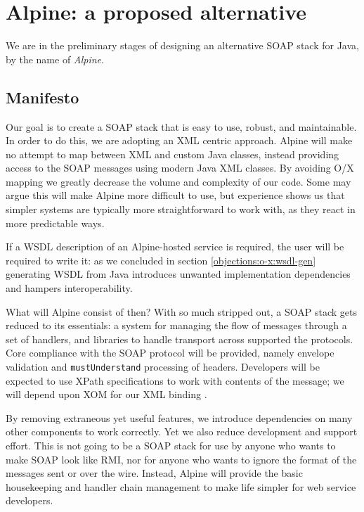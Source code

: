 \section{Alpine: a proposed alternative}
\label{alpine}

We are in the preliminary stages of designing an alternative SOAP
stack for Java, by the name of \emph{Alpine}.

\subsection{Manifesto}
\label{alpine:manifesto}

Our goal is to create a SOAP stack that is easy to use, robust, and
maintainable. In order to do this, we are adopting an XML centric approach.
Alpine will make no attempt to map between XML and custom Java classes, instead
providing access to the SOAP messages using modern Java XML classes. By avoiding
O/X mapping we greatly decrease the volume and complexity of our code. Some may
argue this will make Alpine more difficult to use, but experience shows us that
simpler systems are typically more straightforward to work with, as they react
in more predictable ways.

If a WSDL description of an Alpine-hosted service is required, the
user will be required to write it: as we concluded in section
\ref{objections:o-x:wsdl-gen} generating WSDL from Java introduces
unwanted implementation dependencies and hampers interoperability.

What will Alpine consist of then? With so much stripped out, a SOAP
stack gets reduced to its essentials: a system for managing the flow
of messages through a set of handlers, and libraries to handle
transport across supported the protocols. Core compliance with the
SOAP protocol will be provided, namely envelope validation and
\verb|mustUnderstand| processing of headers. Developers will be
expected to use XPath specifications to work with contents of the
message; we will depend upon XOM for our XML binding
\cite{harold:xom}.

By removing extraneous yet useful features, we introduce dependencies
on many other components to work correctly. Yet we also reduce
development and support effort. This is not going to be a SOAP stack
for use by anyone who wants to make SOAP look like RMI, nor for anyone
who wants to ignore the format of the messages sent or over the wire.
Instead, Alpine will provide the basic housekeeping and handler
chain management to make life simpler for web service developers.

